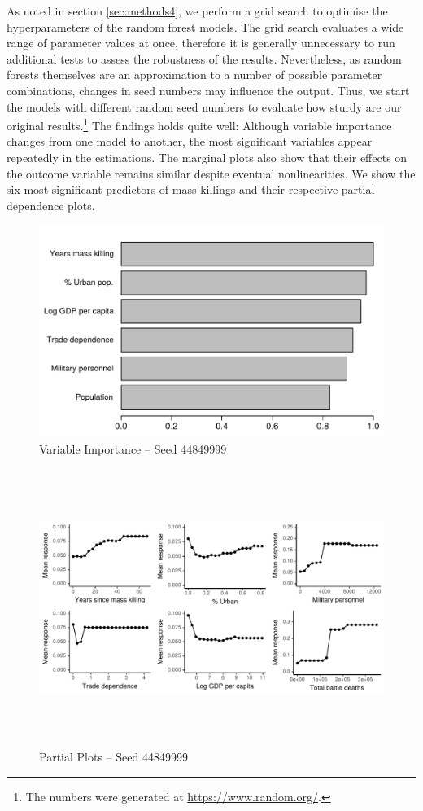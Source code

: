 As noted in section \ref{sec:methods4}, we perform a grid search to optimise the hyperparameters of the random forest models. The grid search evaluates a wide range of parameter values at once, therefore it is generally unnecessary to run additional tests to assess the robustness of the results. Nevertheless, as random forests themselves are an approximation to a number of possible parameter combinations, changes in seed numbers may influence the output. Thus, we start the models with different random seed numbers to evaluate how sturdy are our original results.\footnote{The numbers were generated at \href{https://www.random.org/}{https://www.random.org/}.} The findings holds quite well: Although variable importance changes from one model to another, the most significant variables appear repeatedly in the estimations. The marginal plots also show that their effects on the outcome variable remains similar despite eventual nonlinearities. We show the six most significant predictors of mass killings and their respective partial dependence plots.

\begin{figure}[H]
    \centering
    \includegraphics{images/drf-mk2.pdf}
    \caption{Variable Importance -- Seed 44849999}
    \label{fig:my_label}
\end{figure}

\begin{figure}[H]
    \centering
    \includegraphics[width=\textwidth, height=9cm]{images/drfdpp2.pdf}
    \caption{Partial Plots -- Seed 44849999}
    \label{fig:my_label}
\end{figure}

